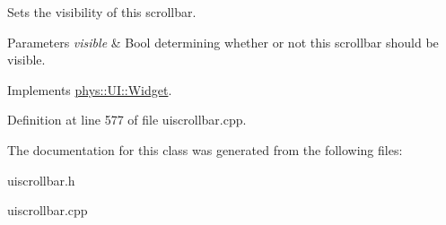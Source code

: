 Sets the visibility of this scrollbar. 


\begin{DoxyParams}{Parameters}
{\em visible} & Bool determining whether or not this scrollbar should be visible. \\
\hline
\end{DoxyParams}


Implements \hyperlink{classphys_1_1UI_1_1Widget_ab049233d8d5522a6ab42654b8924a3e0}{phys::UI::Widget}.



Definition at line 577 of file uiscrollbar.cpp.



The documentation for this class was generated from the following files:\begin{DoxyCompactItemize}
\item 
uiscrollbar.h\item 
uiscrollbar.cpp\end{DoxyCompactItemize}
